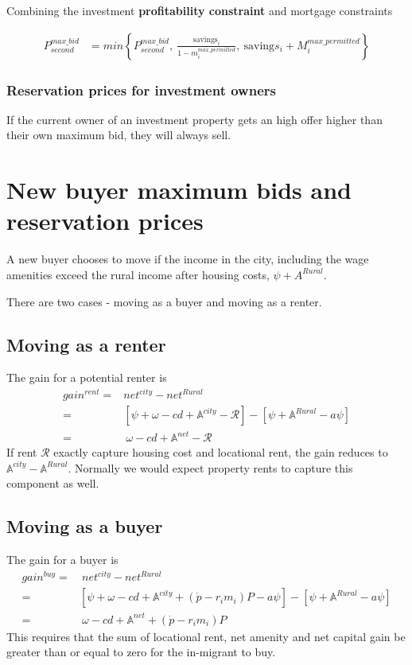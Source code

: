 Combining the investment \textbf{profitability constraint} and mortgage constraints

\begin{eqnarray}
P_{second}^{max\_bid} & = min \left\{P_{second}^{max\_bid},\ \frac{\mathrm{savings}_i}{1-m_i^{max\_permitted}},\ \mathrm{saving}s_i + M_i^{max\_permitted}  \right\}  \nonumber
\end{eqnarray}

\subsubsection{Reservation prices for investment owners}
If the current owner of an investment  property gets an high offer higher than their own maximum bid, they will always sell.  


\section{New buyer maximum bids and reservation prices }
A new buyer chooses to move if the income in the city, including the wage amenities exceed the rural income after housing costs, $\psi+A^{Rural}$. 

There are two cases - moving as a buyer and moving as a renter.

\subsection{Moving as a renter}
The gain for a potential renter is 
\begin{align}
gain^{rent}=&net^{city}-net^{Rural}\nonumber\\
=&\left[\psi+\omega-cd+\mathbb{A}^{city}-\mathcal{R}\right]-\left[\psi+\mathbb{A}^{Rural}-a\psi\right] \nonumber\\
=&\ \omega-cd+\mathbb{A}^{net}-\mathcal{R}
\label{eq-move-to-rent}
\end{align}
If rent $\mathcal{R}$ exactly capture housing cost and locational rent, the gain reduces to $\mathbb{A}^{city}-\mathbb{A}^{Rural}$. Normally we would expect property rents to capture this component  as well. 

\subsection{Moving as a buyer}
The gain for a buyer is 
\begin{align}
gain^{buy}=&\ net^{city}-net^{Rural}\nonumber\\
=&\left[\psi+\omega-cd+\mathbb{A}^{city}+(\dot p-r_im_i)P-a\psi\right]-\left[\psi+\mathbb{A}^{Rural}-a\psi\right] \nonumber\\
=&\ \omega-cd+\mathbb{A}^{net}+(\dot p-r_im_i)P  \label{eq-move-to-buy}
\end{align}
This requires that the sum of  locational rent, net amenity and net capital gain be greater than or equal to zero for the in-migrant to buy.

